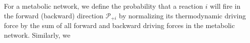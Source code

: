 For a metabolic network, we define the probability that a reaction $i$ will fire in the forward (backward)  direction ${\mathcal P_{+i}}$ by normalizing its thermodynamic driving force by the sum of all forward and backward driving forces in the metabolic network. Similarly, we 